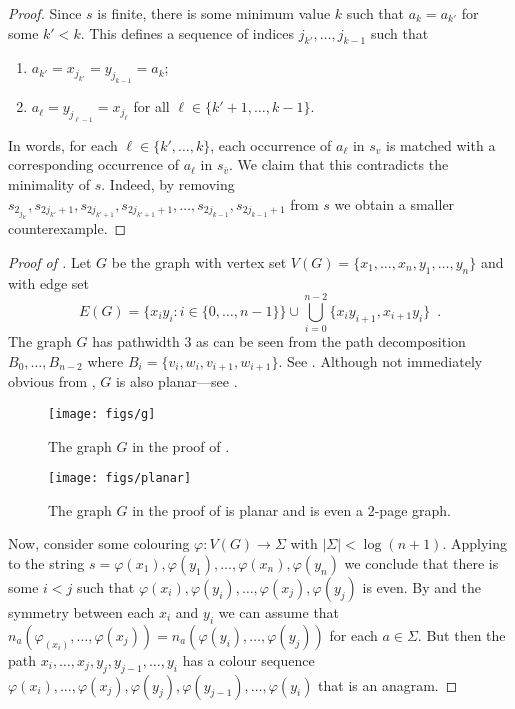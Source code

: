 \documentclass{patmorin}
\begin{document}
\begin{proof}
  Since $s$ is finite, there is some minimum value $k$ such that
  $a_{k}=a_{k'}$ for some $k' < k$.  This defines a sequence of indices
  $j_{k'},\ldots,j_{k-1}$ such that
  \begin{enumerate}
     \item $a_{k'}=x_{j_{k'}}=y_{j_{k-1}}=a_{k}$; 
     \item $a_{\ell}=y_{j_{\ell-1}}=x_{j_\ell}$ for all $\ell\in\{k'+1,\ldots,k-1\}$.
  \end{enumerate}
  In words, for each $\ell\in\{k',\ldots,k\}$, each occurrence of $a_\ell$ in $s_v$ is matched with a corresponding
  occurrence of $a_\ell$ in $s_{\overline{v}}$.
  We claim that this contradicts
  the minimality of $s$. Indeed, by removing
  $s_{2_{j_{k'}}},s_{2j_{k'}+1},s_{2j_{k'+1}},s_{2j_{k'+1}+1},\ldots,s_{2j_{k-1}},s_{2j_{k-1}+1}$
  from $s$ we obtain a smaller counterexample.
\end{proof}

\begin{proof}[Proof of ]
  Let $G$ be the graph with vertex set
  $V(G)=\{x_1,\ldots,x_{n},y_1,\ldots,y_{n}\}$ and with edge set
  \[
    E(G) = \{x_iy_i : i\in\{0,\ldots,n-1\}\} 
              \cup \bigcup_{i=0}^{n-2} \{x_iy_{i+1},x_{i+1}y_i\} \enspace .
  \]
  The graph $G$ has pathwidth 3 as can be seen from the path decomposition
  $B_0,\ldots,B_{n-2}$ where $B_i=\{v_i,w_i,v_{i+1},w_{i+1}\}$.  See
  . Although not immediately obvious from ,
  $G$ is also planar---see .
  
  \begin{figure}
    \begin{center}
      \texttt{[image: figs/g]}
    \end{center}
    \caption{The graph $G$ in the proof of .}
  \end{figure}
  
  \begin{figure}
    \begin{center}
      \texttt{[image: figs/planar]}
    \end{center}
    \caption{The graph $G$ in the proof of  is planar
     and is even a 2-page graph.}
  \end{figure}
  
  Now, consider some colouring $\varphi:V(G)\to\Sigma$
  with $|\Sigma| < \log(n+1)$.  Applying  to
  the string 
  $s=\varphi(x_1),\varphi(y_1),\ldots,\varphi(x_n),\varphi(y_n)$ we
  conclude that there is some $i < j$ such that 
  $\varphi(x_{i}),\varphi(y_i),\ldots,\varphi(x_j),\varphi(y_j)$
  is even.  By  and the
  symmetry between each $x_i$ and $y_i$ we can assume that
  $n_a(\varphi_(x_i),\ldots,\varphi(x_j))=n_a(\varphi(y_i),\ldots,\varphi(y_j))$
  for each $a\in\Sigma$.  But then the path
  $x_i,\ldots,x_j,y_j,y_{j-1},\ldots,y_i$ has a colour sequence
  $\varphi(x_i),\ldots,\varphi(x_j),\varphi(y_j),\varphi(y_{j-1}),\ldots,\varphi(y_i)$
  that is an anagram.
\end{proof}
\end{document}
